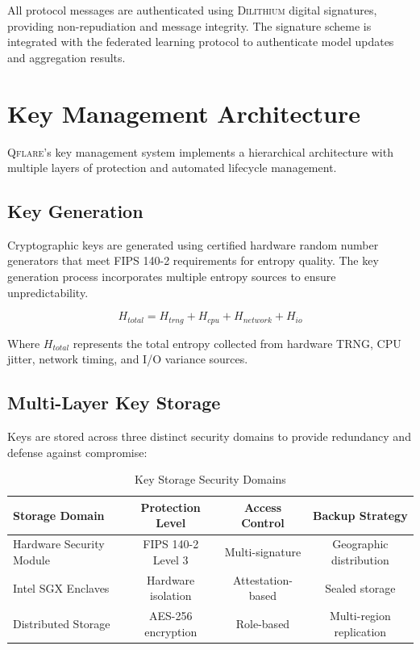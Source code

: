 ﻿\documentclass[12pt,a4paper,twoside]{book}
\newcommand{\qflare}{\textsc{Qflare}}
\newcommand{\dilithium}{\textsc{Dilithium}}
\begin{document}
All protocol messages are authenticated using \dilithium{} digital signatures, providing non-repudiation and message integrity. The signature scheme is integrated with the federated learning protocol to authenticate model updates and aggregation results.

\section{Key Management Architecture}
\label{sec:key-management}

\qflare{}'s key management system implements a hierarchical architecture with multiple layers of protection and automated lifecycle management.

\subsection{Key Generation}
\label{subsec:key-generation}

Cryptographic keys are generated using certified hardware random number generators that meet FIPS 140-2 requirements for entropy quality. The key generation process incorporates multiple entropy sources to ensure unpredictability.

\begin{equation}
\label{eq:entropy-collection}
H_{total} = H_{trng} + H_{cpu} + H_{network} + H_{io}
\end{equation}

Where $H_{total}$ represents the total entropy collected from hardware TRNG, CPU jitter, network timing, and I/O variance sources.

\subsection{Multi-Layer Key Storage}
\label{subsec:key-storage}

Keys are stored across three distinct security domains to provide redundancy and defense against compromise:

\begin{table}[htbp]
\centering
\caption{Key Storage Security Domains}
\label{tab:key-storage}
\begin{tabular}{@{}lccc@{}}
\toprule
Storage Domain & Protection Level & Access Control & Backup Strategy \\
\midrule
Hardware Security Module & FIPS 140-2 Level 3 & Multi-signature & Geographic distribution \\
Intel SGX Enclaves & Hardware isolation & Attestation-based & Sealed storage \\
Distributed Storage & AES-256 encryption & Role-based & Multi-region replication \\
\bottomrule
\end{tabular}
\end{table}
\end{document}
